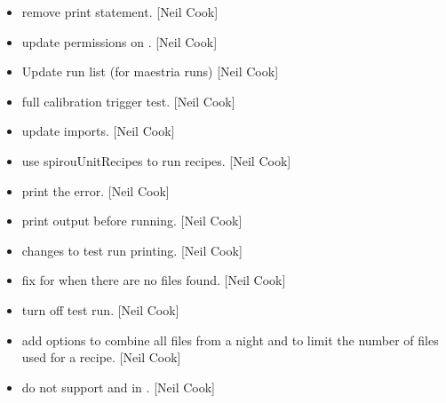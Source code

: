 \documentclass[a4paper,10pt,english]{report}
\begin{document}
\begin{itemize}
\item {} 
 \sphinxhyphen{} remove print statement. {[}Neil Cook{]}

\item {} 
 \sphinxhyphen{} update permissions on . {[}Neil Cook{]}

\item {} 
Update run list (for maestria runs) {[}Neil Cook{]}

\item {} 
 \sphinxhyphen{} full calibration trigger test. {[}Neil Cook{]}

\item {} 
 \sphinxhyphen{} update imports. {[}Neil Cook{]}

\item {} 
 \sphinxhyphen{} use spirouUnitRecipes to run recipes. {[}Neil Cook{]}

\item {} 
 \sphinxhyphen{} print the error. {[}Neil Cook{]}

\item {} 
 \sphinxhyphen{} print output before running. {[}Neil Cook{]}

\item {} 
 \sphinxhyphen{} changes to test run printing. {[}Neil Cook{]}

\item {} 
 \sphinxhyphen{} fix for when there are no files found. {[}Neil
Cook{]}

\item {} 
 \sphinxhyphen{} turn off test run. {[}Neil Cook{]}

\item {} 
 \sphinxhyphen{} add options to combine all files from a night and
to limit the number of files used for a recipe. {[}Neil Cook{]}

\item {} 
 \sphinxhyphen{} do not support  and  in .
{[}Neil Cook{]}

\end{itemize}
\end{document}
